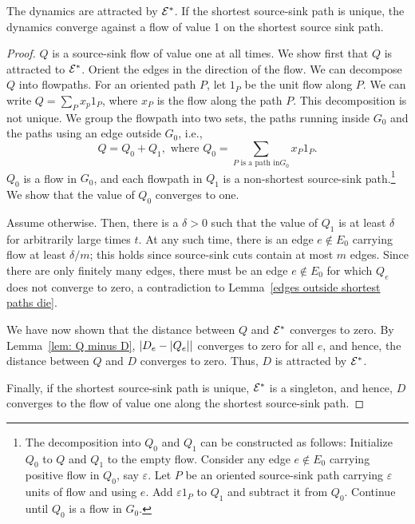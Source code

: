 \documentclass[11pt,a4paper]{article}
\newcommand{\E}{\cal E}
\newcommand{\Estar}{\E^*}
\begin{document}
\begin{theorem}
\label{thm:convergence}\label{thm:main-apx}
The dynamics are attracted by $\Estar$. If the shortest source-sink path is
unique, the dynamics converge against a flow of value 1 on the shortest source
sink path. 
\end{theorem}
\begin{proof} $Q$ is a source-sink flow of value one at all times. We show
first that $Q$ is attracted to $\Estar$. Orient the edges in the
direction of the flow. We can decompose $Q$ into flowpaths. For an oriented
path $P$, let $1_P$ be the unit flow along $P$. We can write $Q = \sum_P x_p
1_P$, where $x_P$ is the flow along the path $P$. This decomposition is not
unique. We group the flowpath into two sets, the paths running inside $G_0$ and
the paths using an edge outside $G_0$, i.e., 
\[         Q = Q_0 + Q_1, \text{ where $Q_0 = \sum_{\text{$P$ is a path in
$G_0$}} x_P 1_P$}.\]
$Q_0$ is a flow in $G_0$, and each flowpath in $Q_1$ is a non-shortest
source-sink path.\footnote{The decomposition into $Q_0$ and $Q_1$ can be
constructed as follows: Initialize $Q_0$ to $Q$ and $Q_1$ to the empty flow. 
Consider any edge $e \not\in E_0$ carrying positive
flow in $Q_0$, say $\varepsilon$. Let $P$ be an oriented source-sink path carrying $\varepsilon$ units of flow and
using $e$. Add $\varepsilon 1_P$ to $Q_1$ and subtract it from $Q_0$. Continue until $Q_0$ is a
flow in $G_0$.} We show that the value of $Q_0$ converges to one. 

Assume otherwise. Then, there is a $\delta > 0$ such that the value of $Q_1$ is
at least $\delta$ for arbitrarily large times $t$. At any such time, there is an
edge $e \not\in E_0$ carrying flow at least $\delta/m$; this holds since
source-sink cuts contain at most $m$ edges. Since there are only finitely many
edges, there must be an edge $e \not\in E_0$ for which $Q_e$ does not converge
to zero, a contradiction to Lemma~\ref{edges outside shortest paths die}. 

We have now shown that the distance between $Q$ and $\Estar$ converges to
zero. By Lemma~\ref{lem: Q minus D},
$| D_e - | Q_e | |$ converges to zero for all $e$, and hence, the distance
between $Q$ and $D$ converges to zero. Thus, $D$ is attracted by $\Estar$. 

Finally, if the shortest source-sink path is unique, $\Estar$ is a singleton,
and hence, $D$ converges to the flow of value one along the shortest source-sink
path. 
\end{proof}
\end{document}

